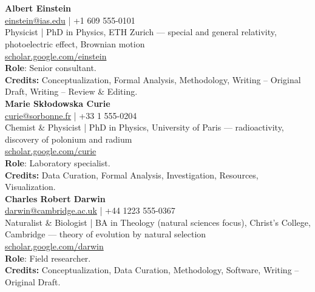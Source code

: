 \section*{\trTeam}
{}
\label{sec:team}

\vspace*{10mm}

\noindent \sffamily \normalsize{\textbf{Albert Einstein}} \rmfamily\\ [1mm]
\small{\href{mailto:einstein@ias.edu}{einstein@ias.edu} | +1 609 555-0101 \\
Physicist | PhD in Physics, ETH Zurich --- special and general relativity, photoelectric effect, Brownian motion \\
\href{https://scholar.google.com/einstein}{scholar.google.com/einstein} \\ [1mm]}
\textbf{Role}: Senior consultant. \\
\textbf{Credits:} Conceptualization, Formal Analysis, Methodology, Writing -- Original Draft, Writing -- Review \& Editing.\\[4mm]

\noindent \sffamily \normalsize{\textbf{Marie Sk\l{}odowska Curie}} \rmfamily\\ [1mm]
\small{\href{mailto:curie@sorbonne.fr}{curie@sorbonne.fr} | +33 1 555-0204 \\
Chemist \& Physicist | PhD in Physics, University of Paris --- radioactivity, discovery of polonium and radium \\
\href{https://scholar.google.com/curie}{scholar.google.com/curie} \\ [1mm]}
\textbf{Role}: Laboratory specialist. \\
\textbf{Credits:} Data Curation, Formal Analysis, Investigation, Resources, Visualization.\\[4mm]

\noindent \sffamily \normalsize{\textbf{Charles Robert Darwin}} \rmfamily\\ [1mm]
\small{\href{mailto:darwin@cambridge.ac.uk}{darwin@cambridge.ac.uk} | +44 1223 555-0367 \\
Naturalist \& Biologist | BA in Theology (natural sciences focus), Christ's College, Cambridge --- theory of evolution by natural selection \\
\href{https://scholar.google.com/darwin}{scholar.google.com/darwin} \\ [1mm]}
\textbf{Role}: Field researcher. \\
\textbf{Credits:} Conceptualization, Data Curation, Methodology, Software, Writing -- Original Draft.\\
